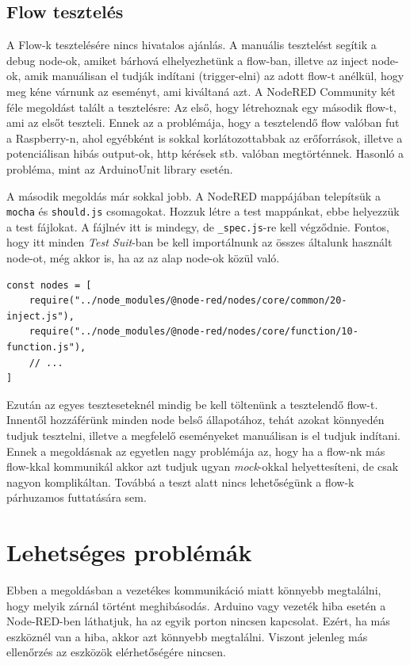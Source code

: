 \documentclass[
]{thesis-ekf}
\theoremstyle{definition}
\theoremstyle{remark}
\begin{document}
\subsection{Flow tesztelés}
A Flow-k tesztelésére nincs hivatalos ajánlás. A manuális tesztelést segítik a debug node-ok, amiket bárhová elhelyezhetünk a flow-ban, illetve az inject node-ok, amik manuálisan el tudják indítani (trigger-elni) az adott flow-t anélkül, hogy meg kéne várnunk az eseményt, ami kiváltaná azt. A NodeRED Community két féle megoldást talált a tesztelésre: Az első, hogy létrehoznak egy második flow-t, ami az elsőt teszteli. Ennek az a problémája, hogy a tesztelendő flow valóban fut a Raspberry-n, ahol egyébként is sokkal korlátozottabbak az erőforrások, illetve a potenciálisan hibás output-ok, http kérések stb. valóban megtörténnek. Hasonló a probléma, mint az ArduinoUnit library esetén.

A második megoldás már sokkal jobb. A NodeRED mappájában telepítsük a \texttt{mocha} és \texttt{should.js} csomagokat. Hozzuk létre a test mappánkat, ebbe helyezzük a test fájlokat. A fájlnév itt is mindegy, de \texttt{\_spec.js}-re kell végződnie. Fontos, hogy itt minden \emph{Test Suit}-ban be kell importálnunk az összes általunk használt node-ot, még akkor is, ha az az alap node-ok közül való. \cite{flow-test}

\begin{lstlisting}[caption={Node-ok importálása}]
const nodes = [
    require("../node_modules/@node-red/nodes/core/common/20-inject.js"),
    require("../node_modules/@node-red/nodes/core/function/10-function.js"),
    // ...
]
\end{lstlisting}

Ezután az egyes teszteseteknél mindig be kell töltenünk a tesztelendő flow-t. Innentől hozzáférünk minden node belső állapotához, tehát azokat könnyedén tudjuk tesztelni, illetve a megfelelő eseményeket manuálisan is el tudjuk indítani. Ennek a megoldásnak az egyetlen nagy problémája az, hogy ha a flow-nk más flow-kkal kommunikál akkor azt tudjuk ugyan \emph{mock}-okkal helyettesíteni, de csak nagyon komplikáltan. Továbbá a teszt alatt nincs lehetőségünk a flow-k párhuzamos futtatására sem. \cite{flow-test}

\section{Lehetséges problémák}
Ebben a megoldásban a vezetékes kommunikáció miatt könnyebb megtalálni, hogy melyik zárnál történt meghibásodás. Arduino vagy vezeték hiba esetén a Node-RED-ben láthatjuk, ha az egyik porton nincsen kapcsolat. Ezért, ha más eszköznél van a hiba, akkor azt könnyebb megtalálni. Viszont jelenleg más ellenőrzés az eszközök elérhetőségére nincsen.
\end{document}
